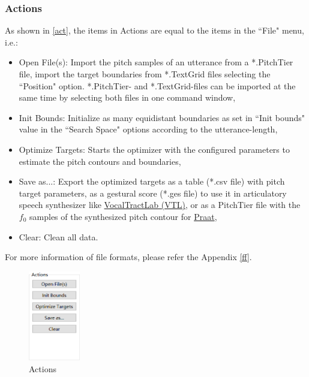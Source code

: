 \subsubsection*{ Actions}
As shown in \autoref{act}, the items in Actions are equal to the items in the ``File" menu, i.e.: 
\begin{itemize}
	\item Open File(s): Import the pitch samples of an utterance from a *.PitchTier file, import the target boundaries from *.TextGrid files selecting the ``Position" option. *.PitchTier- and *.TextGrid-files can be imported at the same time by selecting both files in one command window,
	\item Init Bounds: Initialize as many equidistant boundaries as set in ``Init bounds" value in the ``Search Space" options according to the utterance-length,
	\item Optimize Targets: Starts the optimizer with the configured parameters to estimate the pitch contours and boundaries,
	\item Save as...: Export the optimized targets as a table (*.csv file) with pitch target parameters, as a gestural score (*.ges file) to use it in articulatory speech synthesizer like  \href{https://www.vocaltractlab.de/index.php?page=start}{VocalTractLab (VTL)}, or as a PitchTier file with the $f_{0}$ samples of the synthesized pitch contour for  \href{https://www.fon.hum.uva.nl/praat/}{Praat},
	\item Clear: Clean all data.
\end{itemize}
For more information of file formats, please refer the Appendix \ref{ff}.
\begin{figure}[H]
\centering
\includegraphics[width=0.2\textwidth]{images/actions.png}
\caption{Actions}
\label{act}
\end{figure}


